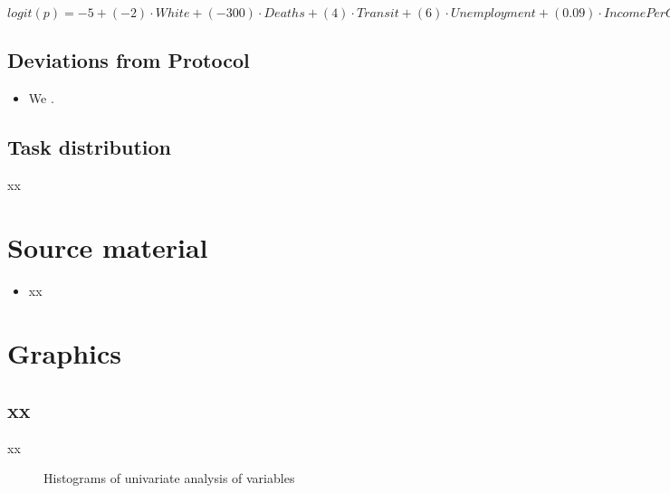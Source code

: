 \documentclass[10pt, a4paper]{report}
\begin{document}
\hspace{0.25in}

$logit(p) = -5 + (-2) \cdot White + (-300) \cdot Deaths + (4) \cdot Transit + (6) \cdot Unemployment + (0.09) \cdot IncomePerCap + (-1300) \cdot White \cdot Deaths + (130) \cdot White \cdot Transit$

\hspace{0.25in}



\subsection{}


\subsection{Deviations from Protocol}


\begin{itemize}
\item We .
\end{itemize} 
\clearpage
\newpage


\begin{appendices}

\subsection{Task distribution}

xx
\newpage

\section{Source material}
\begin{itemize}
\item xx
\end{itemize}
\newpage

\section{Graphics}
\subsection{xx}
\label{appendix: xx}
xx

\begin{figure}[hbt!]
    \centering
    \caption{Histograms of univariate analysis of variables}
    \label{fig:Univariate histograms}
\end{figure}
\newpage





\FloatBarrier
\newpage


\end{appendices}
\end{document}
